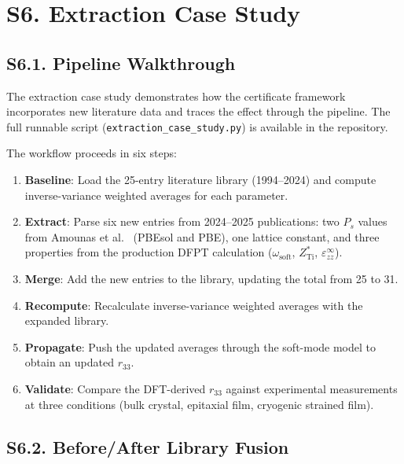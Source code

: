 \documentclass[onecolumn,superscriptaddress,amsmath,amssymb,longbibliography]{revtex4-2}
\begin{document}
\section{S6. Extraction Case Study}
\label{sec:si_extraction}

\subsection{S6.1. Pipeline Walkthrough}

The extraction case study demonstrates how the certificate framework
incorporates new literature data and traces the effect through the pipeline.
The full runnable script (\texttt{extraction\_case\_study.py}) is available
in the repository.

The workflow proceeds in six steps:
\begin{enumerate}
    \item \textbf{Baseline}: Load the 25-entry literature library
    (1994--2024) and compute inverse-variance weighted averages for each
    parameter.

    \item \textbf{Extract}: Parse six new entries from 2024--2025
    publications: two $P_s$ values from Amounas et al.\ \cite{Amounas2024}
    (PBEsol and PBE), one lattice constant, and three properties from the
    production DFPT calculation ($\omega_{\mathrm{soft}}$,
    $Z^*_{\mathrm{Ti}}$, $\varepsilon^\infty_{zz}$).

    \item \textbf{Merge}: Add the new entries to the library, updating the
    total from 25 to 31.

    \item \textbf{Recompute}: Recalculate inverse-variance weighted averages
    with the expanded library.

    \item \textbf{Propagate}: Push the updated averages through the soft-mode
    model to obtain an updated $r_{33}$.

    \item \textbf{Validate}: Compare the DFT-derived $r_{33}$ against
    experimental measurements at three conditions (bulk crystal, epitaxial
    film, cryogenic strained film).
\end{enumerate}


\subsection{S6.2. Before/After Library Fusion}
\end{document}
